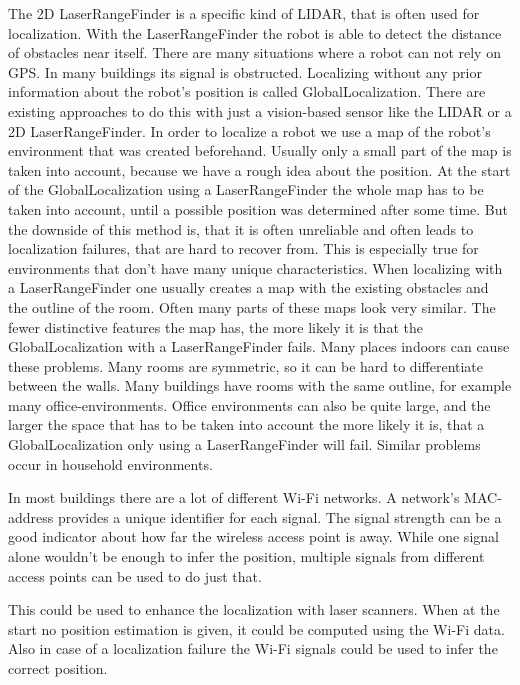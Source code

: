 The 2D \gls{LaserRangeFinder} is a specific kind of \Gls{LIDAR}, that is often used for localization. With the \gls{LaserRangeFinder} the robot is able to detect the distance of obstacles near itself. There are many situations where a robot can not rely on \Gls{GPS}. In many buildings its signal is obstructed.
Localizing without any prior information about the robot's position is called \gls{GlobalLocalization}.
There are existing approaches to do this with just a vision-based sensor like the \Gls{LIDAR} or a 2D \gls{LaserRangeFinder}. In order to localize a robot we use a map of the robot's environment that was created beforehand. Usually only a small part of the map is taken into account, because we have a rough idea about the position.  
At the start of the \gls{GlobalLocalization} using a \gls{LaserRangeFinder} the whole map has to be taken into account, until a possible position was determined after some time.
But the downside of this method is, that it is often unreliable and often leads to localization failures, that are hard to recover from. This is especially true for environments that don't have many unique characteristics. When localizing with a \gls{LaserRangeFinder} one usually creates a map with the existing obstacles and the outline of the room. Often many parts of these maps look very similar. The fewer distinctive features the map has, the more likely it is that the \gls{GlobalLocalization} with a \gls{LaserRangeFinder} fails. 
Many places indoors can cause these problems. Many rooms are symmetric, so it can be hard to differentiate between the walls. Many buildings have rooms with the same outline, for example many office-environments. Office environments can also be quite large, and the larger the space that has to be taken into account the more likely it is, that a \gls{GlobalLocalization} only using a \gls{LaserRangeFinder} will fail. Similar problems occur in household environments. 
 
In most buildings there are a lot of different Wi-Fi \citep{ieee802.11-2012} networks. A network's \Gls{MAC-address} provides a unique identifier for each signal. The signal strength can be a good indicator about how far the wireless access point is away. While one signal alone wouldn't be enough to infer the position, multiple signals from different access points can be used to do just that.

This could be used to enhance the localization with laser scanners. When at the start no position estimation is given, it could be computed using the Wi-Fi data. Also in case of a localization failure the Wi-Fi signals could be used to infer the correct position.

